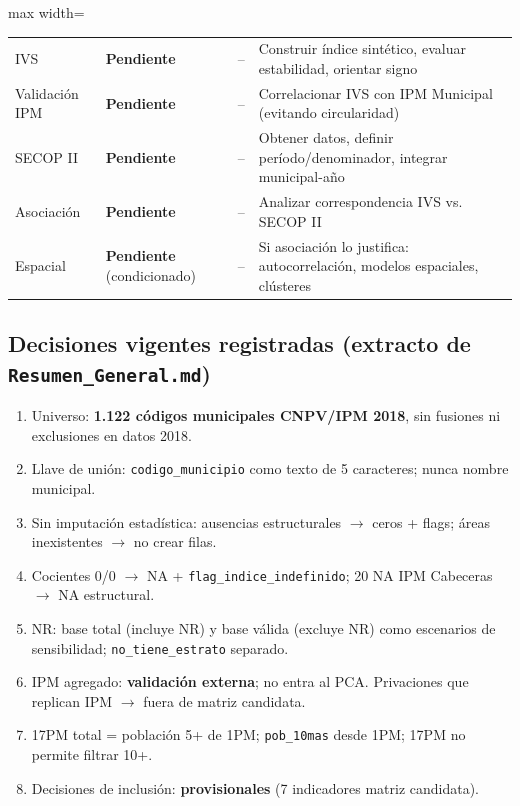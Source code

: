 \begin{table}[htbp]
\begin{adjustbox}{max width=\textwidth}
\begin{tabular}{@{}llll@{}}
IVS & \textbf{Pendiente} & -- & Construir índice sintético, evaluar estabilidad, orientar signo \\
Validación IPM & \textbf{Pendiente} & -- & Correlacionar IVS con IPM Municipal (evitando circularidad) \\
SECOP II & \textbf{Pendiente} & -- & Obtener datos, definir período/denominador, integrar municipal-año \\
Asociación & \textbf{Pendiente} & -- & Analizar correspondencia IVS vs. SECOP II \\
Espacial & \textbf{Pendiente} (condicionado) & -- & Si asociación lo justifica: autocorrelación, modelos espaciales, clústeres \\
\bottomrule
\end{tabular}
\end{adjustbox}
\end{table}

\subsection{Decisiones vigentes registradas (extracto de \texttt{Resumen\_General.md})}
\label{sec:decisiones_vigentes}

\begin{enumerate}
    \item Universo: \textbf{1.122 códigos municipales CNPV/IPM 2018}, sin fusiones ni exclusiones en datos 2018.
    \item Llave de unión: \texttt{codigo\_municipio} como texto de 5 caracteres; nunca nombre municipal.
    \item Sin imputación estadística: ausencias estructurales $\rightarrow$ ceros + flags; áreas inexistentes $\rightarrow$ no crear filas.
    \item Cocientes 0/0 $\rightarrow$ NA + \texttt{flag\_indice\_indefinido}; 20 NA IPM Cabeceras $\rightarrow$ NA estructural.
    \item NR: base total (incluye NR) y base válida (excluye NR) como escenarios de sensibilidad; \texttt{no\_tiene\_estrato} separado.
    \item IPM agregado: \textbf{validación externa}; no entra al PCA. Privaciones que replican IPM $\rightarrow$ fuera de matriz candidata.
    \item 17PM total = población 5+ de 1PM; \texttt{pob\_10mas} desde 1PM; 17PM no permite filtrar 10+.
    \item Decisiones de inclusión: \textbf{provisionales} (7 indicadores matriz candidata).
\end{enumerate}

